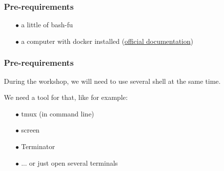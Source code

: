 
	\begin{frame}
		\frametitle{Pre-requirements}

		\begin{itemize}
			\item[$\bullet$] a little of bash-fu
			\item[$\bullet$] a computer with docker installed (\href{https://docs.docker.com/v17.09/engine/installation/}{official documentation})
		\end{itemize}
		
	\end{frame}
	
	\begin{frame}
		\frametitle{Pre-requirements}
		
		During the workshop, we will need to use several shell at the same time.
		
		\medskip
		
		We need a tool for that, like for example:
		\begin{itemize}
			\item[$\bullet$] tmux (in command line)
			\item[$\bullet$] screen
			\item[$\bullet$] Terminator
			\item[$\bullet$] ... or just open several terminals
		\end{itemize}
	\end{frame}
